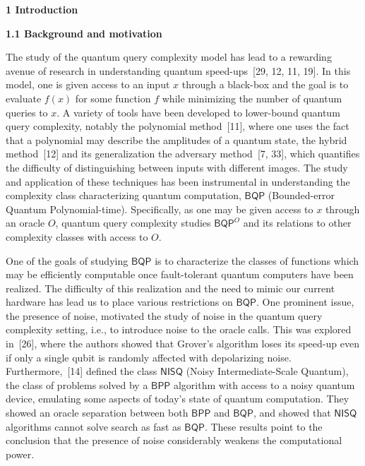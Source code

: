 

\par\medskip\noindent\textbf{
1 Introduction}\par




\par\medskip\noindent\textbf{
1.1 Background and motivation}\par




The study of the quantum query complexity model has lead to a rewarding avenue of research in understanding quantum speed-ups [29, 12, 11, 19]. In this model, one is given access to an input $x$ through a black-box and the goal is to evaluate $f(x)$ for some function $f$ while minimizing the number of quantum queries to $x$. A variety of tools have been developed to lower-bound quantum query complexity, notably the polynomial method [11], where one uses the fact that a polynomial may describe the amplitudes of a quantum state, the hybrid method [12] and its generalization the adversary method [7, 33], which quantifies the difficulty of distinguishing between inputs with different images. The study and application of these techniques has been instrumental in understanding the complexity class characterizing quantum computation, $\mathsf{BQP}$ (Bounded-error Quantum Polynomial-time). Specifically, as one may be given access to $x$ through an oracle $O$, quantum query complexity studies $\mathsf{BQP}^{O}$ and its relations to other complexity classes with access to $O$.\par




One of the goals of studying $\mathsf{BQP}$ is to characterize the classes of functions which may be efficiently computable once fault-tolerant quantum computers have been realized. The difficulty of this realization and the need to mimic our current hardware has lead us to place various restrictions on $\mathsf{BQP}$. One prominent issue, the presence of noise, motivated the study of noise in the quantum query complexity setting, i.e., to introduce noise to the oracle calls. This was explored in [26], where the authors showed that Grover’s algorithm loses its speed-up even if only a single qubit is randomly affected with depolarizing noise. Furthermore, [14] defined the class $\mathsf{NISQ}$ (Noisy Intermediate-Scale Quantum), the class of problems solved by a $\mathsf{BPP}$ algorithm with access to a noisy quantum device, emulating some aspects of today’s state of quantum computation. They showed an oracle separation between both $\mathsf{BPP}$ and $\mathsf{BQP}$, and showed that $\mathsf{NISQ}$ algorithms cannot solve search as fast as $\mathsf{BQP}$.
These results point to the conclusion that the presence of noise considerably weakens the computational power.\par




